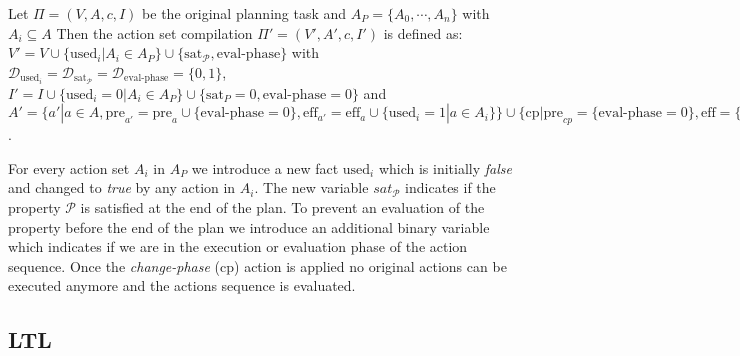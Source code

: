 \begin{definition}
	Let $\Pi = (V, A, c, I)$ be the original planning task and $A_P=\{A_0, \cdots, A_n\}$ 
	with $A_i \subseteq A$ 
	Then the action set compilation $\Pi' = (V', A', c, I')$ is defined as: 
	$V' = V \cup \{\text{used}_i | A_i \in A_P\} \cup \{\text{sat}_{\mathcal{P}}, \text{eval-phase}\}$ 
	with $\mathcal{D}_{\text{used}_i} = \mathcal{D}_{\text{sat}_{\mathcal{P}}} = \mathcal{D}_{\text{eval-phase}} = \{0,1\}$, 
	$I' = I \cup \{\text{used}_i = 0 | A_i \in A_P\} \cup \{\text{sat}_{P} = 0, \text{eval-phase} = 0\}$ 
	and $A' = \{ a' | a \in A, 
	\text{pre}_{a'} = \text{pre}_{a} \cup \{\text{eval-phase} = 0\} , \text{eff}_{a'} = \text{eff}_a \cup \{\text{used}_i = 1 | a \in A_i\}\} \cup 
	\{\text{cp} | \text{pre}_{cp} = \{\text{eval-phase} = 0\}, \text{eff} = \{\text{eval-phase} = 1 \}\} \cup 
	\{\text{actions to eval } \mathcal{P}\}$. 
\end{definition}

For every action set $A_i$ in $A_P$ we introduce a new fact $\text{used}_i$ which is initially 
\emph{false} and changed to \emph{true} by any action in $A_i$. The new variable $sat_{\mathcal{P}}$ indicates 
if the property $\mathcal{P}$ is satisfied at the end of the plan. To prevent an 
evaluation of the property before the end of the plan we introduce an additional binary variable
which indicates if we are in the execution or evaluation phase of the action sequence. Once the \textit{change-phase} (cp) action
is applied no original actions can be executed anymore and the actions sequence is evaluated.


\subsection{LTL}


